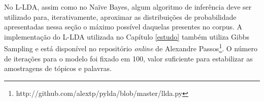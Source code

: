 No L-LDA, assim como no Naïve Bayes, algum algoritmo de inferência deve ser utilizado para, iterativamente, aproximar as distribuições de probabilidade apresentadas nessa seção o máximo possível daquelas presentes no corpus. A implementação do L-LDA utilizada no Capítulo \ref{estudo} também utiliza Gibbs Sampling e está disponível no repositório \emph{online} de Alexandre Passos\footnote{http://github.com/alextp/pylda/blob/master/llda.py}. O número de iterações para o modelo foi fixado em 100, valor suficiente para estabilizar as amostragens de tópicos e palavras.



  


